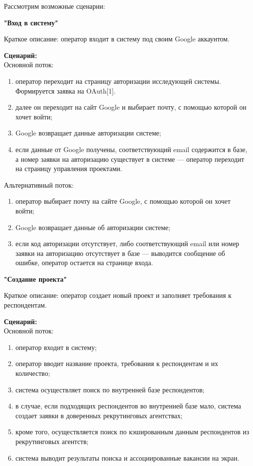 Рассмотрим возможные сценарии:

\textbf{"Вход в систему"}

Краткое описание: оператор входит в систему под своим Google аккаунтом.

\textbf{Сценарий:}\\
Основной поток:
\begin{enumerate}
\item оператор переходит на страницу авторизации исследующей системы. Формируется заявка на OAuth[1].
\item далее он переходит на сайт Google и выбирает почту, с помощью которой он хочет войти;
\item Google  возвращает данные авторизации системе;
\item если данные от Google получены, соответствующий email содержится в базе, а номер заявки на авторизацию существует в системе — оператор переходит на страницу управления проектами.
\end{enumerate}
Альтернативный поток:
\begin{enumerate}
\item оператор выбирает почту на сайте Google, с помощью которой он хочет войти;
\item Google возвращает данные об авторизации системе;
\item если код авторизации отсутствует, либо соответствующий email или номер заявки на авторизацию отсутствует в базе — выводится сообщение об ошибке, оператор остается на странице входа.
\end{enumerate}

\textbf{"Создание проекта"}

Краткое описание: оператор создает новый проект и заполняет требования к респондентам.

\textbf{Сценарий:}\\
Основной поток:
\begin{enumerate}
\item оператор входит в систему;
\item оператор вводит название проекта, требования к респондентам и их количество;
\item система осуществляет поиск по внутренней базе респондентов;
\item в случае, если подходящих респондентов во внутренней базе мало, система создает заявки в доверенных рекрутинговых агентствах;
\item кроме того, осуществляется поиск по кэшированным данным респондентов из рекрутинговых агентств;
\item система выводит результаты поиска и ассоциированные вакансии на экран.
\end{enumerate} 

